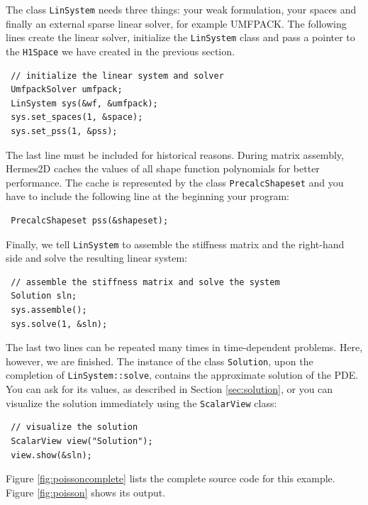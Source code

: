 The class {\tt LinSystem} needs three things: your weak formulation, your spaces and 
finally an external sparse linear solver, for example UMFPACK. The following lines
create the linear solver, initialize the {\tt LinSystem} class and pass a pointer to
the {\tt H1Space} we have created in the previous section.

\begin{lstlisting}
 // initialize the linear system and solver
 UmfpackSolver umfpack;
 LinSystem sys(&wf, &umfpack);
 sys.set_spaces(1, &space);
 sys.set_pss(1, &pss);
\end{lstlisting}

The last line must be included for historical reasons. During matrix assembly,
Hermes2D caches the values of all shape function polynomials for better performance.
The cache is represented by the class {\tt PrecalcShapeset} and you have to
include the following line at the beginning your program:

\begin{lstlisting}
 PrecalcShapeset pss(&shapeset);
\end{lstlisting}

Finally, we tell {\tt LinSystem} to assemble the stiffness matrix and the right-hand
side and solve the resulting linear system: 

\begin{lstlisting}
 // assemble the stiffness matrix and solve the system
 Solution sln;
 sys.assemble();
 sys.solve(1, &sln);
\end{lstlisting}

The last two lines can be repeated many times in time-dependent problems. Here,
however, we are finished. The instance of the class {\tt Solution}, upon the
completion of {\tt LinSystem::solve}, contains the approximate solution of
the PDE. You can ask for its values, as described in Section \ref{sec:solution},
or you can visualize the solution immediately using the {\tt ScalarView} class:

\begin{lstlisting}
 // visualize the solution
 ScalarView view("Solution");
 view.show(&sln);
\end{lstlisting}

Figure \ref{fig:poissoncomplete} lists the complete source code for this example.
Figure \ref{fig:poisson} shows its output.

